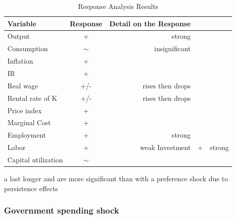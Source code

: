 \documentclass{article}
\begin{document}
\begin{table}[H]    
    \centering  
    \begin{threeparttable}    
    \caption{Response Analysis Results}    
    \label{tab:response_analysis}    
    \begin{tabular}{lcr}    
        \toprule    
        \textbf{Variable} & \textbf{Response} & \textbf{Detail on the Response} \\    
        \midrule    
        Output & + & strong  \\    
        Consumption & $\sim$ & insignificant \\ 
        Inflation & + &  \\
        IR & + & \\   
        Real wage & +/- & rises then drops\\  
        Rental rate of K & +/- & rises then drops \\
        Price index & + & \\
        Marginal Cost & + &  \\
        Employment & + & strong \\   
        Labor & + & weak
        Investment & + & strong \\
        Capital utilization & $\sim$ & \\
        \bottomrule    
    \end{tabular}  
    \begin{tablenotes}  
        \small  
        \item[a] last longer and are more significant than with a preference shock due to persistence effects
    \end{tablenotes}  
    \end{threeparttable}    
\end{table} 

\subsubsection{Government spending shock}
\end{document}
